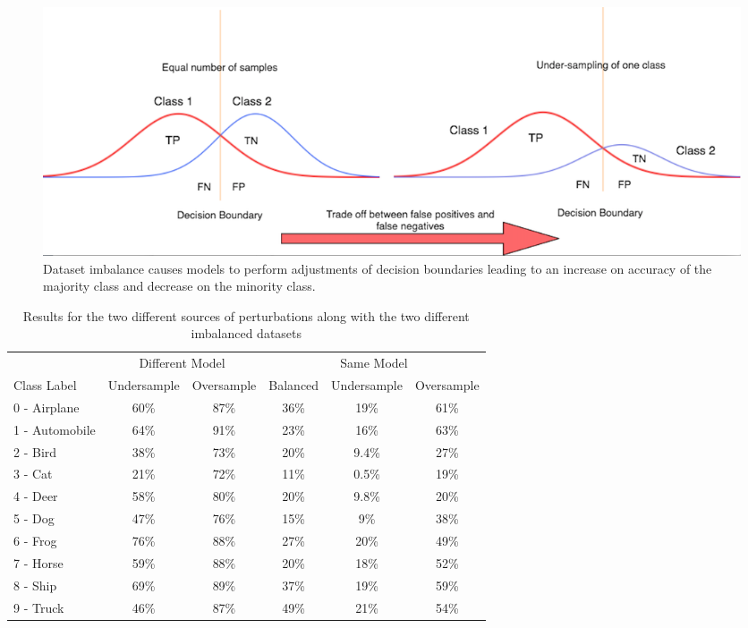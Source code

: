 \begin{figure}[H]
	\centering
	\includegraphics[scale=0.32]{class_dist.png}
	\caption{Dataset imbalance causes models to perform adjustments of decision boundaries leading to an increase on accuracy of the majority class and decrease on the minority class.}
	\label{fig:class_dist}
\end{figure}



\begin{table}[H]
	\centering
	
	\begin{tabular}{lccccc}
		\toprule
		&\multicolumn{2}{c}{Different Model}
		&\multicolumn{3}{c}{Same Model}
		\\\cmidrule(r){2-3}\cmidrule(l){4-6}
		Class Label &Undersample &Oversample &Balanced &Undersample &Oversample \\
		\midrule
		0 - Airplane &60\%& 87\% &36\%& 19\%    & 61\% \\
		1 - Automobile &64\%& 91\% &23\%& 16\%    & 63\% \\
		2 - Bird &38\%& 73\% &20\%& 9.4\%    & 27\% \\
		3 - Cat &21\%& 72\% &11\%& 0.5\%    & 19\% \\
		4 - Deer &58\%& 80\% &20\%& 9.8\%    & 20\% \\
		5 - Dog &47\%& 76\% &15\%& 9\%    & 38\% \\
		6 - Frog &76\%& 88\% &27\%& 20\%    & 49\% \\
		7 - Horse &59\%& 88\% &20\%& 18\%    & 52\% \\
		8 - Ship &69\%& 89\% &37\%& 19\%    & 59\% \\
		9 - Truck &46\%& 87\% &49\%& 21\%    & 54\% \\
		\bottomrule
	\end{tabular}
	\caption{Results for the two different sources of perturbations along with the two different imbalanced datasets}
	\label{tbl:results}
\end{table}

